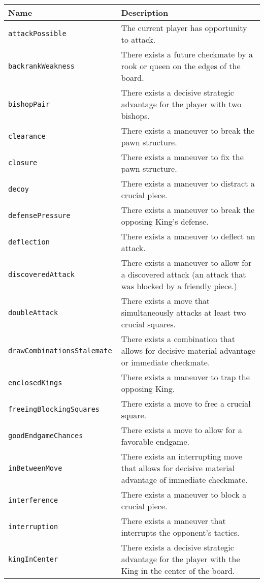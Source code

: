 \documentclass[11pt]{article}
\begin{document}
\begin{table*}
\centering
\begin{tabular}{lp{}}
\hline
\textbf{Name} & \textbf{Description} \\ \hline
\tt{attackPossible} & The current player has opportunity to attack. \\
\tt{backrankWeakness} & There exists a future checkmate by a rook or queen on the edges of the board. \\
\tt{bishopPair} & There exists a decisive strategic advantage for the player with two bishops. \\
\tt{clearance} & There exists a maneuver to break the pawn structure. \\ 
\tt{closure} & There exists a maneuver to fix the pawn structure. \\
\tt{decoy} & There exists a maneuver to distract a crucial piece. \\
\tt{defensePressure} & There exists a maneuver to break the opposing King’s defense. \\
\tt{deflection} & There exists a maneuver to deflect an attack.  \\ 
\tt{discoveredAttack} & There exists a maneuver to allow for a discovered attack (an attack that was blocked by a friendly piece.) \\
\tt{doubleAttack} & There exists a move that simultaneously attacks at least two crucial squares. \\
\tt{drawCombinationsStalemate} & There exists a combination that allows for decisive material advantage or immediate checkmate. \\
\tt{enclosedKings} & There exists a maneuver to trap the opposing King. \\
\tt{freeingBlockingSquares} & There exists a move to free a crucial square. \\
\tt{goodEndgameChances} & There exists a move to allow for a favorable endgame. \\
\tt{inBetweenMove} & There exists an interrupting move that allows for decisive material advantage of immediate checkmate. \\ 
\tt{interference} & There exists a maneuver to block a crucial piece. \\ 
\tt{interruption} & There exists a maneuver that interrupts the opponent’s tactics. \\
\tt{kingInCenter} & There exists a decisive strategic advantage for the player with the King in the center of the board. \\

\end{tabular}
\end{table*}
\end{document}
